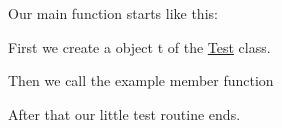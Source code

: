  Our main function starts like this\-: 
\begin{DoxyCodeInclude}

\end{DoxyCodeInclude}
 First we create a object {\ttfamily t} of the \hyperlink{class_test}{Test} class. 
\begin{DoxyCodeInclude}

\end{DoxyCodeInclude}
 Then we call the example member function 
\begin{DoxyCodeInclude}

\end{DoxyCodeInclude}
 After that our little test routine ends. 
\begin{DoxyCodeInclude}

\end{DoxyCodeInclude}
 